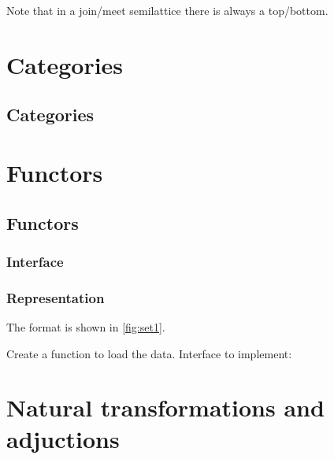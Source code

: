 


Note that in a join/meet semilattice there is always a top/bottom.


\chapter{Categories}

\section{Categories}





\chapter{Functors}


\section{Functors}

\subsection{Interface}

\subsection{Representation}
The format is shown in \cref{fig:set1}.




\begin{exercise}
  Create a function to load the data.
  Interface to implement:
%
\end{exercise}


\chapter{Natural transformations and adjuctions}


